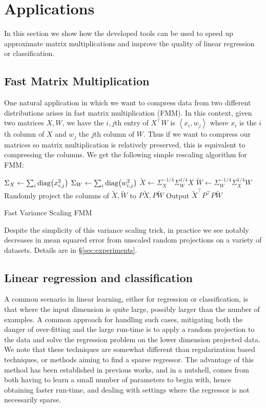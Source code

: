 \documentclass{article}
\theoremstyle{definition}
\theoremstyle{plain}
\DeclarePairedDelimiter\parentheses{\lparen}{\rparen}
\newcommand{\diag}[1]{\operatorname{diag} \parentheses*{#1}}
\newcommand{\ip}[1]{\left \langle #1 \right \rangle}
\begin{document}
%
%
%
%
%
%
%
%
%
%
%
%
%
%
%
%
%

\section{Applications}

In this section we show how the developed tools can be used to speed up approximate matrix multiplications and improve the quality of linear regression or classification.

\subsection{Fast Matrix Multiplication} \label{sec:FMM}
One natural application in which we want to compress data from two different distributions arises in fast matrix multiplication (FMM). In this context, given two matrices $X, W$, we have the $i,j$th entry of $X^\top W$ is $\ip{x_i, w_j}$ where $x_i$ is the $i$th column of $X$ and $w_j$ the $j$th column of $W$. Thus if we want to compress our matrices so matrix multiplication is relatively preserved, this is equivalent to compressing the columns. We get the following simple rescaling algorithm for FMM: \\

\begin{algorithm}[H]
 $\Sigma_X \gets \sum_i \diag{ x_{i,j}^2 }$\;
 $\Sigma_W \gets \sum_i \diag{ w_{i,j}^2 }$\;
 $\tilde{X} \gets \Sigma_X^{-1/4}\Sigma_W^{1/4}X$\;
 $\tilde{W} \gets \Sigma_W^{-1/4}\Sigma_X^{1/4}W$\;
 Randomly project the columns of $\tilde{X}, \tilde{W}$ to $P \tilde{X}, P \tilde{W}$\;
 Output $\tilde{X}^\top P^\top P \tilde{W}$\;
 \caption{Fast Variance Scaling FMM}
 \end{algorithm}
Despite the simplicity of this variance scaling trick, in practice we see notably decreases in mean squared error from unscaled random projections on a variety of datasets. Details are in \S\ref{sec:experiments}.



\subsection{Linear regression and classification} \label{sec:linear}

A common scenario in linear learning, either for regression or classification, is that where the input dimension is quite large, possibly larger than the number of examples. A common approach for handling such cases, mitigating both the danger of over-fitting and the large run-time is to apply a random projection to the data and solve the regression problem on the lower dimension projected data. We note that these techniques are somewhat different than regularization based techniques, or methods aiming to find a sparse regressor. The advantage of this method has been established in previous works, and in a nutshell, comes from both having to learn a small number of parameters to begin with, hence obtaining faster run-time, and dealing with settings where the regressor is not necessarily sparse.
\end{document}
